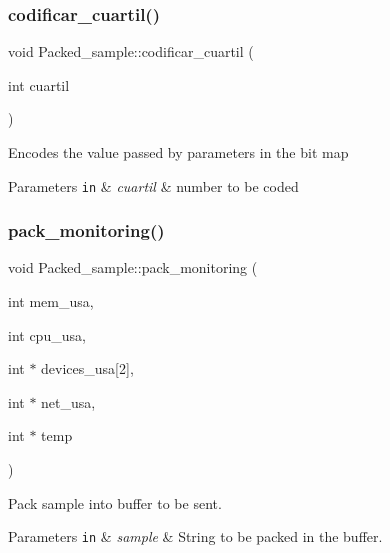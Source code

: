 \subsubsection{\texorpdfstring{codificar\+\_\+cuartil()}{codificar\_cuartil()}}
{\footnotesize\ttfamily void Packed\+\_\+sample\+::codificar\+\_\+cuartil (\begin{DoxyParamCaption}\item[{int}]{cuartil }\end{DoxyParamCaption})}

Encodes the value passed by parameters in the bit map


\begin{DoxyParams}[1]{Parameters}
\mbox{\tt in}  & {\em cuartil} & number to be coded \\
\hline
\end{DoxyParams}
\mbox{\label{classPacked__sample_acc6f96c07fc1df249ae439b7644deeeb}} 
\subsubsection{\texorpdfstring{pack\+\_\+monitoring()}{pack\_monitoring()}}
{\footnotesize\ttfamily void Packed\+\_\+sample\+::pack\+\_\+monitoring (\begin{DoxyParamCaption}\item[{int}]{mem\+\_\+usa,  }\item[{int}]{cpu\+\_\+usa,  }\item[{int $\ast$}]{devices\+\_\+usa\mbox{[}2\mbox{]},  }\item[{int $\ast$}]{net\+\_\+usa,  }\item[{int $\ast$}]{temp }\end{DoxyParamCaption})}

Pack sample into buffer to be sent.


\begin{DoxyParams}[1]{Parameters}
\mbox{\tt in}  & {\em sample} & String to be packed in the buffer. \\
\hline
\end{DoxyParams}
\mbox{\label{classPacked__sample_a4649ca58fb22958ffbae97337bc33576}} 
